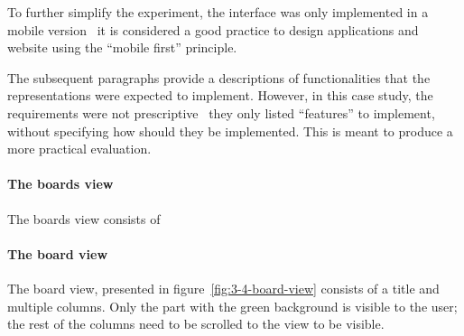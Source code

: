 To further simplify the experiment, the interface was only implemented in a mobile version \textendash\ it is considered a good practice to design applications and website using the \enquote{mobile first} principle.%

The subsequent paragraphs provide a descriptions of functionalities that the representations were expected to implement.
However, in this case study, the requirements were not prescriptive \textendash\ they only listed \enquote{features} to implement, without specifying how should they be implemented.
This is meant to produce a more practical evaluation.


\paragraph{The boards view}
The boards view consists of\textellipsis
{}

\paragraph{The board view}
The board view, presented in figure~\ref{fig:3-4-board-view} consists of a title and multiple columns.
Only the part with the green background is visible to the user;
the rest of the columns need to be scrolled to the view to be visible.


